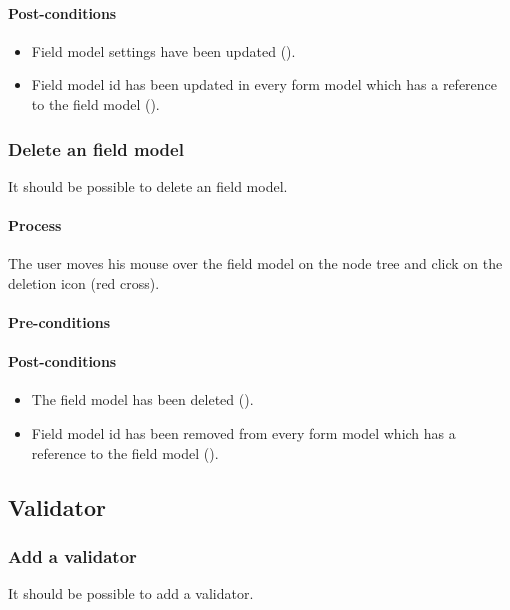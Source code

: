 \documentclass[11pt,a4paper,oneside]{article}
\begin{document}
\paragraph{Post-conditions}
\begin{itemize}
	\item Field model settings have been updated ().
	\item Field model id has been updated in every form model which has a reference to the field model ().
\end{itemize}

\subsubsection{Delete an field model}
It should be possible to delete an field model.

\paragraph{Process}
The user moves his mouse over the field model on the node tree and click on the deletion icon (red cross).

\paragraph{Pre-conditions}

\paragraph{Post-conditions}
\begin{itemize}
	\item The field model has been deleted ().
	\item Field model id has been removed from every form model which has a reference to the field model ().
\end{itemize}

\subsection{Validator}

\subsubsection{Add a validator}
It should be possible to add a validator.
\end{document}
